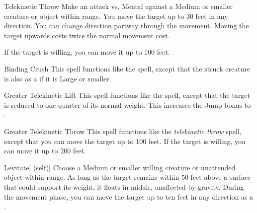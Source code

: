 \lowercase{\hypertarget{spell:Telekinetic Throw}{}}\label{spell:Telekinetic Throw}
\begin{ability}[\nth{1}]{\hypertarget{spell:Telekinetic Throw}{Telekinetic Throw}}
Make an attack vs. Mental against a Medium or smaller creature or object within \rngmed range.
\hit You move the target up to 30 feet in any direction.
You can change direction partway through the movement.
Moving the target upwards costs twice the normal movement cost.

If the target is willing, you can move it up to 100 feet.
\end{ability}
\vspace{0.25em}



\lowercase{\hypertarget{spell:Binding Crush}{}}\label{spell:Binding Crush}
\begin{ability}[\nth{2}]{\hypertarget{spell:Binding Crush}{Binding Crush}}
This spell functions like the  spell, except that the struck creature is also  as a  if it is Large or smaller.
\end{ability}
\vspace{0.25em}



\lowercase{\hypertarget{spell:Greater Telekinetic Lift}{}}\label{spell:Greater Telekinetic Lift}
\begin{ability}[\nth{3}]{\hypertarget{spell:Greater Telekinetic Lift}{Greater Telekinetic Lift}}
This spell functions like the  spell, except that the target is reduced to one quarter of its normal weight.
This increases the Jump bonus to .
\end{ability}
\vspace{0.25em}



\lowercase{\hypertarget{spell:Greater Telekinetic Throw}{}}\label{spell:Greater Telekinetic Throw}
\begin{ability}[\nth{3}]{\hypertarget{spell:Greater Telekinetic Throw}{Greater Telekinetic Throw}}
This spell functions like the \textit{telekinetic throw} spell, except that you can move the target up to 100 feet.
If the target is willing, you can move it up to 200 feet.
\end{ability}
\vspace{0.25em}



\lowercase{\hypertarget{spell:Levitate}{}}\label{spell:Levitate}
\begin{ability}[\nth{4}]{\hypertarget{spell:Levitate}{Levitate}}[ (self)]
Choose a Medium or smaller willing creature or unattended object within \rngclose range.
As long as the target remains within 50 feet above a surface that could support its weight, it floats in midair, unaffected by gravity.
During the movement phase, you can move the target up to ten feet in any direction as a .
\end{ability}
\vspace{0.25em}



